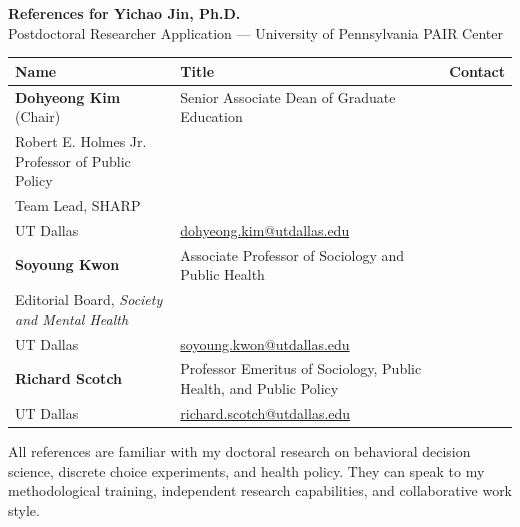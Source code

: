 \documentclass[11pt, letterpaper]{article}
\begin{document}
\thispagestyle{empty}

\begin{center}
    {\Large \textbf{References for Yichao Jin, Ph.D.}}\\
    \vspace{0.3em}
    Postdoctoral Researcher Application --- University of Pennsylvania PAIR Center
\end{center}

\vspace{1em}

\begin{table}[h]
\centering
\renewcommand{\arraystretch}{1.5}
\begin{tabular}{>{\raggedright}p{3cm} >{\raggedright}p{5cm} >{\raggedright\arraybackslash}p{6cm}}
\toprule
\textbf{Name} & \textbf{Title} & \textbf{Contact} \\
\midrule

\textbf{Dohyeong Kim} (Chair) & 
Senior Associate Dean of Graduate Education \\
Robert E. Holmes Jr. Professor of Public Policy \\
Team Lead, SHARP \\
UT Dallas & 
\href{mailto:dohyeong.kim@utdallas.edu}{dohyeong.kim@utdallas.edu} \\
\midrule

\textbf{Soyoung Kwon} & 
Associate Professor of Sociology and Public Health \\
Editorial Board, \textit{Society and Mental Health} \\
UT Dallas & 
\href{mailto:soyoung.kwon@utdallas.edu}{soyoung.kwon@utdallas.edu} \\
\midrule

\textbf{Richard Scotch} & 
Professor Emeritus of Sociology, Public Health, and Public Policy \\
UT Dallas & 
\href{mailto:richard.scotch@utdallas.edu}{richard.scotch@utdallas.edu} \\
\bottomrule
\end{tabular}
\end{table}

\vspace{1em}

\noindent All references are familiar with my doctoral research on behavioral decision science, discrete choice experiments, and health policy. They can speak to my methodological training, independent research capabilities, and collaborative work style.
\end{document}

